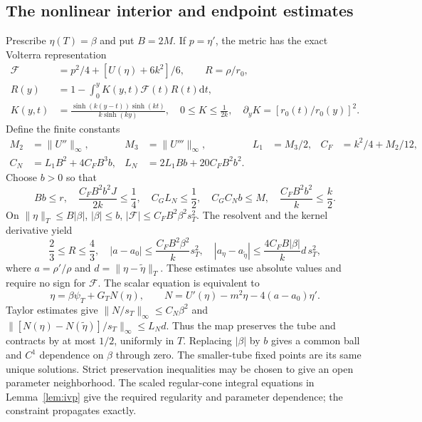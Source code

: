 \documentclass[11pt]{article}
\newcommand{\dd}{\mathrm{d}}
\begin{document}
\subsection{The nonlinear interior and endpoint estimates}
Prescribe $\eta(T)=\beta$ and put $B=2M$. If $p=\eta'$, the metric has the exact Volterra representation
\begin{align}
\mathcal F&=p^2/4+[U(\eta)+6k^2]/6,\qquad R=\rho/r_0,\nonumber\\
R(y)&=1-\int_0^yK(y,t)\mathcal F(t)R(t)\dd t,\nonumber\\
K(y,t)&=\frac{\sinh(k(y-t))\sinh(kt)}{k\sinh(ky)},\quad
0\le K\le\frac1{2k},\quad
\partial_yK=[r_0(t)/r_0(y)]^2.
\end{align}
Define the finite constants
\begin{align}
M_2&=\|U''\|_\infty,&M_3&=\|U'''\|_\infty,&L_1&=M_3/2,&C_F&=k^2/4+M_2/12,\nonumber\\
C_N&=L_1B^2+4C_FB^3b,&L_N&=2L_1Bb+20C_FB^2b^2.\label{eq:nonlinearconstants}
\end{align}
Choose $b>0$ so that
\begin{equation}
Bb\le r,\quad \frac{C_FB^2b^2J}{2k}\le\frac14,\quad
C_GL_N\le\frac12,\quad C_GC_Nb\le M,\quad
\frac{C_FB^2b^2}{k}\le\frac{k}{2}.\label{eq:bconditions}
\end{equation}
On $\|\eta\|_T\le B|\beta|$, $|\beta|\le b$, $|\mathcal F|\le C_FB^2\beta^2s_T^2$. The resolvent and the kernel derivative yield
\begin{equation}
\frac23\le R\le\frac43,\quad
|a-a_0|\le\frac{C_FB^2\beta^2}{k}s_T^2,\quad
|a_\eta-a_{\widetilde\eta}|\le\frac{4C_FB|\beta|}{k}d\,s_T^2,
\label{eq:metricbounds}
\end{equation}
where $a=\rho'/\rho$ and $d=\|\eta-\widetilde\eta\|_T$. These estimates use absolute values and require no sign for $\mathcal F$. The scalar equation is equivalent to
\begin{equation}
\eta=\beta\psi_T+G_TN(\eta),\qquad
N=U'(\eta)-m^2\eta-4(a-a_0)\eta'.
\end{equation}
Taylor estimates give $\|N/s_T\|_\infty\le C_N\beta^2$ and
$\|[N(\eta)-N(\widetilde\eta)]/s_T\|_\infty\le L_Nd$. Thus the map preserves the tube and contracts by at most $1/2$, uniformly in $T$. Replacing $|\beta|$ by $b$ gives a common ball and $C^1$ dependence on $\beta$ through zero. The smaller-tube fixed points are its same unique solutions. Strict preservation inequalities may be chosen to give an open parameter neighborhood. The scaled regular-cone integral equations in Lemma~\ref{lem:ivp} give the required regularity and parameter dependence; the constraint propagates exactly.
\end{document}
